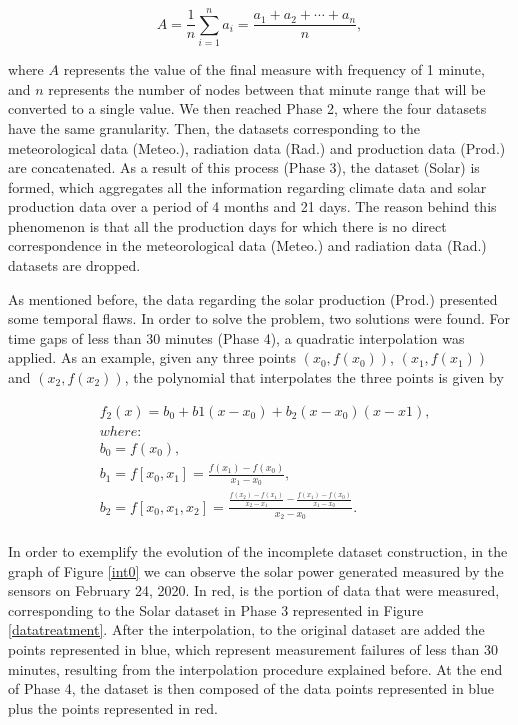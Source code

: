 \begin{equation}
     A={\frac {1}{n}}\sum _{i=1}^{n}a_{i}={\frac {a_{1}+a_{2}+\cdots +a_{n}}{n}},
\label{amean}
\end{equation}

where $A$ represents the value of the final measure with frequency of 1 minute, and $n$ represents the number of nodes between that minute range that will be converted to a single value. We then reached Phase 2, where the four datasets have the same granularity. Then, the datasets corresponding to the meteorological data (Meteo.), radiation data (Rad.) and production data (Prod.) are concatenated. As a result of this process (Phase 3), the dataset (Solar) is formed, which aggregates all the information regarding climate data and solar production data over a period of 4 months and 21 days. The reason behind this phenomenon is that all the production days for which there is no direct correspondence in the meteorological data (Meteo.) and radiation data (Rad.) datasets are dropped. 

As mentioned before, the data regarding the solar production (Prod.) presented some temporal flaws. In order to solve the problem, two solutions were found. For time gaps of less than 30 minutes (Phase 4), a quadratic interpolation was applied. As an example, given any three points $(x_0, f(x_0))$, $(x_1, f(x_1))$ and $(x_2, f(x_2))$, the polynomial that interpolates the three points is given by

\begin{equation}
\begin{split}
     & f_2(x)=b_0+b1(x-x_0)+b_2(x-x_0)(x-x1),\\
     & where:\\
     & b_0=f(x_0),\\
     & b_1=f[x_0,x_1]=\frac{f(x_1)-f(x_0)}{x_1-x_0},\\
     & b_2=f[x_0,x_1,x_2]=\frac{\frac{f(x_2)-f(x_1)}{x_2-x_1}-\frac{f(x_1)-f(x_0)}{x_1-x_0}}{x_2-x_0}.\\
\end{split}
\label{poly}
\end{equation}

In order to exemplify the evolution of the incomplete dataset construction, in the graph of Figure \ref{int0} we can observe the solar power generated measured by the sensors on February 24, 2020. In red, is the portion of data that were measured, corresponding to the Solar dataset in Phase 3 represented in Figure \ref{datatreatment}. After the interpolation, to the original dataset are added the points represented in blue, which represent measurement failures of less than 30 minutes, resulting from the interpolation procedure explained before. At the end of Phase 4, the dataset is then composed of the data points represented in blue plus the points represented in red.



